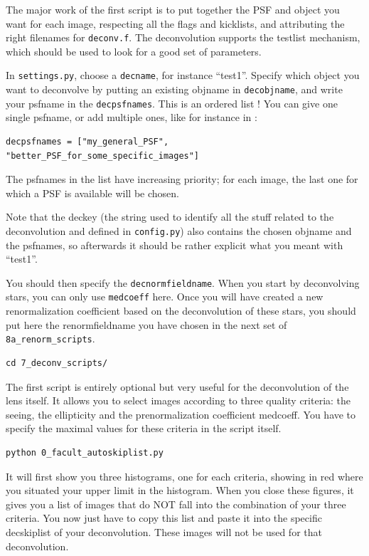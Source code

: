The major work of the first script is to put together the PSF and object you want for each image, respecting all the flags and kicklists, and attributing the right filenames for \verb+deconv.f+. The deconvolution supports the testlist mechanism, which should be used to look for a good set of parameters.

In \verb+settings.py+,  choose a \verb+decname+, for instance ``test1''. Specify which object you want to deconvolve by putting an existing objname in \verb+decobjname+, and write your psfname in the \verb+decpsfnames+. This is an ordered list ! You can give one single psfname, or add multiple ones, like for instance in :

\begin{Verbatim}[fontsize=\relsize{-1}]
decpsfnames = ["my_general_PSF", "better_PSF_for_some_specific_images"]
\end{Verbatim}

The psfnames in the list have increasing priority; for each image, the last one for which a PSF is available will be chosen.

Note that the deckey (the string used to identify all the stuff related to the deconvolution and defined in \verb+config.py+) also contains the chosen objname and the psfnames, so afterwards it should be rather explicit what you meant with ``test1''.

You should then specify the \verb+decnormfieldname+. When you start by deconvolving stars, you can only use \verb+medcoeff+ here. Once you will have created a new renormalization coefficient based on the deconvolution of these stars, you should put here the renormfieldname you have chosen in the next set of \verb+8a_renorm_scripts+.

\begin{Verbatim}
cd 7_deconv_scripts/
\end{Verbatim}

The first script is entirely optional but very useful for the deconvolution of the lens itself. It allows you to select images according to three quality criteria: the seeing, the ellipticity and the prenormalization coefficient medcoeff. You have to specify the maximal values for these criteria in the script itself.

\begin{Verbatim}
python 0_facult_autoskiplist.py
\end{Verbatim}

It will first show you three histograms, one for each criteria, showing in red where you situated your upper limit in the histogram. When you close these figures, it gives you a list of images that do NOT fall into the combination of your three criteria. You now just have to copy this list and paste it into the specific decskiplist of your deconvolution. These images will not be used for that deconvolution.

